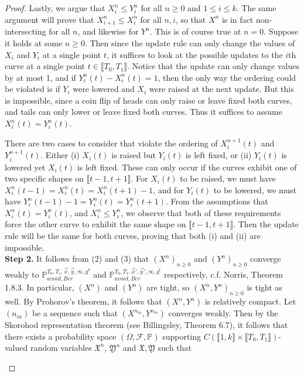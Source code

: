 \documentclass[12pt]{article}
\begin{document}
\begin{proof}
	Lastly, we argue that $X^n_i\leq Y^n_i$ for all $n\geq 0$ and $1\leq i\leq k$. The same argument will prove that $X^n_{i+1}\leq X^n_i$ for all $n,i$, so that $X^n$ is in fact non-intersecting for all $n$, and likewise for $Y^n$. This is of course true at $n=0$. Suppose it holds at some $n\geq 0$. Then since the update rule can only change the values of $X_i$ and $Y_i$ at a single point $t$, it suffices to look at the possible updates to the $i$th curve at a single point $t\in\llbracket T_0, T_1\rrbracket$. Notice that the update can only change values by at most 1, and if $Y^n_i(t) - X^n_i(t) = 1$, then the only way the ordering could be violated is if $Y_i$ were lowered and $X_i$ were raised at the next update. But this is impossible, since a coin flip of heads can only raise or leave fixed both curves, and tails can only lower or leave fixed both curves. Thus it suffices to assume $X^n_i(t) = Y^n_i(t)$. 
	
	There are two cases to consider that violate the ordering of $X^{n+1}_i(t)$ and $Y^{n+1}_i(t)$. Either (i) $X_i(t)$ is raised but $Y_i(t)$ is left fixed, or (ii) $Y_i(t)$ is lowered yet $X_i(t)$ is left fixed. These can only occur if the curves exhibit one of two specific shapes on $\llbracket t-1, t+1\rrbracket$. For $X_i(t)$ to be raised, we must have $X^n_i(t-1) = X^n_i(t) = X^n_i(t+1) - 1$, and for $Y_i(t)$ to be lowered, we must have $Y^n_i(t-1) - 1 = Y^n_i(t) = Y^n_i(t+1)$. From the assumptions that $X^n_i(t) = Y^n_i(t)$, and $X^n_i \leq Y^n_i$, we observe that both of these requirements force the other curve to exhibit the same shape on $\llbracket t-1, t+1\rrbracket$. Then the update rule will be the same for both curves, proving that both (i) and (ii) are impossible. \\
	
	\textbf{Step 2.} It follows from (2) and (3) that $(X^n)_{n\geq 0}$ and $(Y^n)_{n\geq 0}$ converge weakly to $\mathbb{P}_{avoid,Ber}^{T_0,T_1,\vec{x},\vec{y},\infty,g^b}$ and $\mathbb{P}_{avoid,Ber}^{T_0,T_1,\vec{x}',\vec{y}',\infty,g^t}$ respectively, c.f. Norris, Theorem 1.8.3. In particular, $(X^n)$ and $(Y^n)$ are tight, so $(X^n,Y^n)_{n\geq 0}$ is tight as well. By Prohorov's theorem, it follows that $(X^n,Y^n)$ is relatively compact. Let $(n_m)$ be a sequence such that $(X^{n_m},Y^{n_m})$ converges weakly. Then by the Skorohod representation theorem (see Billingsley, Theorem 6.7), it follows that there exists a probability space $(\Omega,\mathcal{F},\mathbb{P})$ supporting $C(\llbracket 1, k\rrbracket \times \llbracket T_0, T_1\rrbracket)$-valued random variables $\mathfrak{X}^n$, $\mathfrak{Y}^n$ and $\mathfrak{X},\mathfrak{Y}$ such that
	\begin{enumerate}[label=(\arabic*)]
		

\end{enumerate}
\end{proof}
\end{document}
